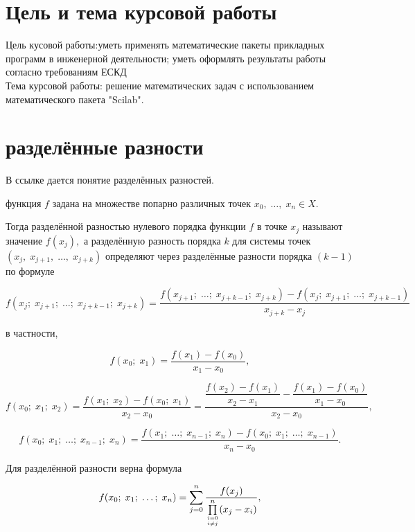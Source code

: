 \documentclass[russian,utf8,nocolumnxxxi,nocolumnxxxii]{eskdtext}
\begin{document}
\maketitle
\tableofcontents
\newpage
\section{Цель и тема курсовой работы}
Цель кусовой работы:уметь применять математические пакеты прикладных программ в инженерной деятельности; уметь оформлять результаты работы согласно требованиям ЕСКД\\
Тема курсовой работы: решение математических задач с использованием математического пакета "Scilab".\\
\newpage

\section{разделённые разности}
В ссылке \cite{raznosty} дается понятие разделённых разностей.

функция $f$ задана на множестве попарно различных точек $x_0,\;\ldots,\;x_n \in X.$
 
Тогда
разделённой разностью нулевого порядка функции $f$ в точке $x_j$ называют значение $f(x_j) ,$ а разделённую разность порядка $k$ для системы точек $(x_j, \; x_{j+1}, \; \ldots, \; x_{j+k})$ определяют через разделённые разности порядка $(k-1)$ по формуле

$$
f(x_j; \; x_{j+1}; \; \ldots; \; x_{j+k-1}; \; x_{j+k}) = \frac{f(x_{j+1}; \; \ldots; \; x_{j+k-1}; \; x_{j+k}) - f(x_{j}; \; x_{j+1};\;\ldots;\;x_{j+k-1})}{x_{j+k}-x_{j}}
$$

в частности,

$$f(x_0;\;x_1)=\frac{f(x_1)-f(x_0)}{x_1-x_0} ,$$

$$f(x_0;\;x_1;\;x_2)=\frac{f(x_1;\;x_2)-f(x_0;\;x_1)}{x_2-x_0}=\dfrac{\dfrac{f(x_2)-f(x_1)}{x_2-x_1}-\dfrac{f(x_1)-f(x_0)}{x_1-x_0}}{x_2-x_0} ,$$

$$f(x_0;\;x_1;\;\ldots;\;x_{n-1};\;x_n) = \frac{f(x_1;\;\ldots;\;x_{n-1};\;x_n) - f(x_0;\;x_1;\;\ldots;\;x_{n-1})}{x_n-x_0} .$$

Для разделённой разности верна формула

$$f(x_0;\;x_1;\;\ldots;\;x_n)=\sum_{j=0}^n\dfrac{f(x_j)}{\prod\limits_{i=0\atop i\neq j}^n(x_j-x_i)},$$
\end{document}
